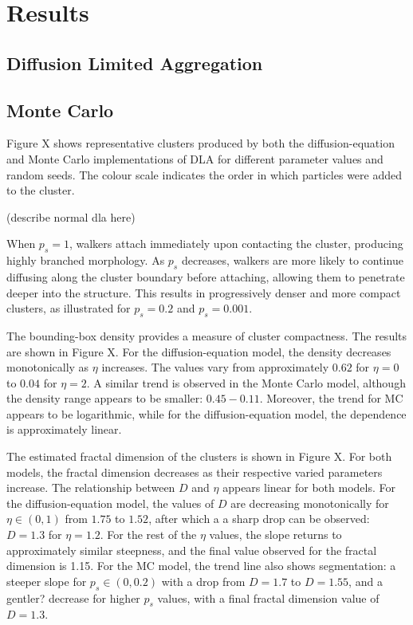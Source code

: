 \documentclass[10pt, journal]{IEEEtran}
\begin{document}
 
\section{Results}




\subsection{Diffusion Limited Aggregation}

\subsection{Monte Carlo}


Figure X shows representative clusters produced by both the diffusion-equation and Monte Carlo implementations of DLA for different parameter values and random seeds. The colour scale indicates the order in which particles were added to the cluster.

(describe normal dla here)

When $p_s=1$, walkers attach immediately upon contacting the cluster, producing highly branched morphology. As $p_s$ decreases, walkers are more likely to continue diffusing along the cluster boundary before attaching, allowing them to penetrate deeper into the structure. This results in progressively denser and more compact clusters, as illustrated for $p_s=0.2$ and $p_s=0.001$.

The bounding-box density provides a measure of cluster compactness. The results are shown in Figure X. For the diffusion-equation model, the density decreases monotonically as $\eta$ increases. The values vary from approximately $0.62$ for $\eta = 0$  to $0.04$ for $\eta = 2$.  A similar trend is observed in the Monte Carlo model, although the density range appears to be smaller: $0.45-0.11$. Moreover, the trend for MC appears to be logarithmic, while for the diffusion-equation model, the dependence is approximately linear.

The estimated fractal dimension of the clusters is shown in Figure X. For both models, the fractal dimension decreases as their respective varied parameters increase.  The relationship between $D$ and $\eta$ appears linear for both models. For the diffusion-equation model, the values of $D$ are decreasing monotonically for $\eta \in (0,1)$ from  $1.75$ to $1.52$, after which a a sharp drop can be observed: $D=1.3$ for $\eta=1.2$.  For the rest of the $\eta$ values, the slope returns to approximately similar steepness, and the final value observed for the fractal dimension is 1.15.  For the MC model, the trend line also shows segmentation: a steeper slope for $p_s \in (0, 0.2)$ with a drop from $D=1.7$ to $D=1.55$, and a gentler? decrease for higher $p_s$ values, with a final fractal dimension value of $D=1.3$. 
\end{document}

